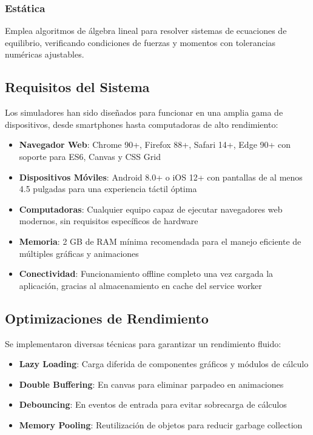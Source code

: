 \subsubsection{Estática}
Emplea algoritmos de álgebra lineal para resolver sistemas de ecuaciones de equilibrio, verificando condiciones de fuerzas y momentos con tolerancias numéricas ajustables.

\subsection{Requisitos del Sistema}

Los simuladores han sido diseñados para funcionar en una amplia gama de dispositivos, desde smartphones hasta computadoras de alto rendimiento:

\begin{itemize}
    \item \textbf{Navegador Web}: Chrome 90+, Firefox 88+, Safari 14+, Edge 90+ con soporte para ES6, Canvas y CSS Grid
    
    \item \textbf{Dispositivos Móviles}: Android 8.0+ o iOS 12+ con pantallas de al menos 4.5 pulgadas para una experiencia táctil óptima
    
    \item \textbf{Computadoras}: Cualquier equipo capaz de ejecutar navegadores web modernos, sin requisitos específicos de hardware
    
    \item \textbf{Memoria}: 2 GB de RAM mínima recomendada para el manejo eficiente de múltiples gráficas y animaciones
    
    \item \textbf{Conectividad}: Funcionamiento offline completo una vez cargada la aplicación, gracias al almacenamiento en cache del service worker
\end{itemize}

\subsection{Optimizaciones de Rendimiento}

Se implementaron diversas técnicas para garantizar un rendimiento fluido:

\begin{itemize}
    \item \textbf{Lazy Loading}: Carga diferida de componentes gráficos y módulos de cálculo
    \item \textbf{Double Buffering}: En canvas para eliminar parpadeo en animaciones
    \item \textbf{Debouncing}: En eventos de entrada para evitar sobrecarga de cálculos
    \item \textbf{Memory Pooling}: Reutilización de objetos para reducir garbage collection
\end{itemize}

